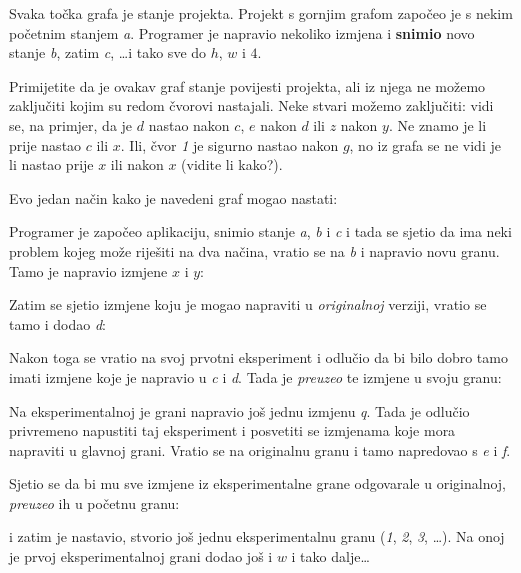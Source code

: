 

Svaka točka grafa je stanje projekta. 
Projekt s gornjim grafom započeo je s nekim početnim stanjem \emph a.
Programer je napravio nekoliko izmjena i \textbf{snimio} novo stanje \emph b, zatim \emph c, \dots i tako sve do $h$, $w$ i $4$.

Primijetite da je ovakav graf stanje povijesti projekta, ali iz njega ne možemo zaključiti kojim su redom čvorovi nastajali.
Neke stvari možemo zaključiti: vidi se, na primjer, da je $d$ nastao nakon $c$, $e$ nakon $d$ ili $z$ nakon $y$.
Ne znamo je li prije nastao $c$ ili $x$.
Ili, čvor \emph 1 je sigurno nastao nakon $g$, no iz grafa se ne vidi je li nastao prije $x$ ili nakon $x$ (vidite li kako?).

Evo jedan način kako je navedeni graf mogao nastati:



Programer je započeo aplikaciju, snimio stanje \emph a, \emph b i \emph c i tada se sjetio da ima neki problem kojeg može riješiti na dva načina, vratio se na \emph b i napravio novu granu. Tamo je napravio izmjene $x$ i $y$:



Zatim se sjetio izmjene koju je mogao napraviti u \emph{originalnoj} verziji, vratio se tamo i dodao \emph d:



Nakon toga se vratio na svoj prvotni eksperiment i odlučio da bi bilo dobro tamo imati izmjene koje je napravio u \emph c i \emph d.
Tada je \emph{preuzeo} te izmjene u svoju granu:



Na eksperimentalnoj je grani napravio još jednu izmjenu \emph q.
Tada je odlučio privremeno napustiti taj eksperiment i posvetiti se izmjenama koje mora napraviti u glavnoj grani.
Vratio se na originalnu granu i tamo napredovao s \emph e i \emph f. 



Sjetio se da bi mu sve izmjene iz eksperimentalne grane odgovarale u originalnoj, \emph{preuzeo} ih u početnu granu:



i zatim je nastavio, stvorio još jednu eksperimentalnu granu (\emph 1, \emph 2, \emph 3, \dots).
Na onoj je prvoj eksperimentalnoj grani dodao još i $w$ i tako dalje\dots

